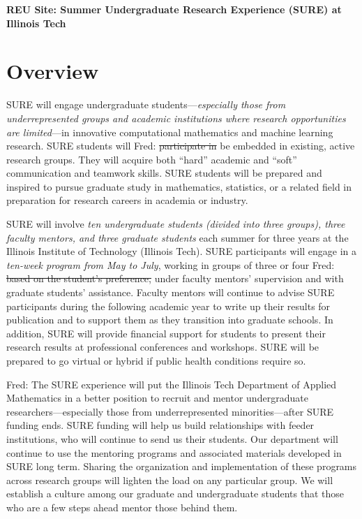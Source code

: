 \documentclass[11pt]{NSFamsart}
\newcommand{\FJHNote}[1]{{\color{blue}Fred: #1}}
\begin{document}

\begin{center}
\Large 
\textbf{REU Site: Summer Undergraduate Research Experience (SURE) at Illinois Tech}
\end{center}



\section{Overview} 
SURE will engage undergraduate students---\emph{especially those from underrepresented groups and academic institutions where research opportunities are limited}---in innovative computational mathematics and machine learning research.  SURE students will \FJHNote{\sout{participate in} be embedded in existing, }active research groups. They will acquire both ``hard'' academic and ``soft'' communication and teamwork skills.  SURE students will be prepared and inspired to pursue graduate study in mathematics, statistics, or a related field in preparation for research careers in academia or industry.

SURE will involve \emph{ten undergraduate students (divided into three groups), three faculty mentors, and three graduate students} each summer for three years at the Illinois Institute of Technology (Illinois Tech).  SURE participants will engage in a \emph{ten-week program from May to July}, working in groups of three or four \FJHNote{\sout{based on the student's preference,}} under faculty mentors' supervision and with graduate students' assistance. Faculty mentors will continue to advise SURE participants during the following academic year to write up their results for publication and to support them as they transition into graduate schools. In addition, SURE will provide financial support for students to present their research results at professional conferences and workshops.
SURE will be prepared to go virtual or hybrid if public health conditions require so.

\FJHNote{The SURE experience will put the Illinois Tech Department of Applied Mathematics in a better position to recruit and mentor undergraduate researchers---especially those from underrepresented minorities---after SURE funding ends. SURE funding will help us build relationships with feeder institutions, who will continue to send us their students.  Our department will continue to use the mentoring programs and associated materials developed in SURE long term.  Sharing the organization and implementation of these programs across research groups will lighten the load on any particular group. We will establish a culture among our graduate and undergraduate students that those who are a few steps ahead mentor those behind them.}
\end{document}
